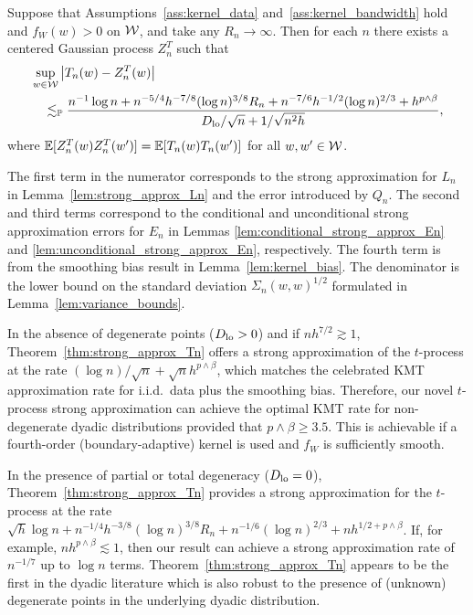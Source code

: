 \begin{theorem}
  \label{thm:strong_approx_Tn}

  Suppose that Assumptions~\ref{ass:kernel_data}
  and~\ref{ass:kernel_bandwidth} hold and
  $f_W(w) > 0$ on $\mathcal{W}$, and take any $R_n \to \infty$.
  Then for each $n$ there exists a
  centered Gaussian process $Z_n^{T}$ such that
  \begin{align*}
    &\sup_{w \in \mathcal{W}}
    \left|
    T_n(w)
    -
    Z_n^{T}(w)
    \right| \\
    &\quad\lesssim_{\mathbb{P}}
    \frac{
      n^{-1} \log n
      + n^{-5/4} h^{-7/8} (\log n)^{3/8} R_n
      + n^{-7/6} h^{-1/2} (\log n)^{2/3}
    + h^{p\wedge\beta}}
    {D_{\textup{lo}}/\sqrt{n} + 1/\sqrt{n^2h}},
  \end{align*}
  where $\mathbb{E}[Z_n^T(w)Z_n^T(w')] = \mathbb{E}[T_n(w)T_n(w')]$
  for all $w,w' \in \mathcal{W}$.
\end{theorem}

The first term in the numerator corresponds to
the strong approximation for $L_n$ in Lemma~\ref{lem:strong_approx_Ln}
and the error introduced by $Q_n$.
The second and third terms correspond to the conditional
and unconditional strong approximation errors for
$E_n$ in Lemmas \ref{lem:conditional_strong_approx_En}
and \ref{lem:unconditional_strong_approx_En}, respectively.
The fourth term is from the smoothing bias result
in Lemma~\ref{lem:kernel_bias}.
The denominator is the lower bound on the standard
deviation $\Sigma_n(w,w)^{1/2}$
formulated in Lemma~\ref{lem:variance_bounds}.

In the absence of degenerate points ($D_{\textup{lo}} > 0$) and if
$n h^{7/2}\gtrsim 1$, Theorem~\ref{thm:strong_approx_Tn}
offers a strong approximation of the $t$-process at the rate
$(\log n)/\sqrt{n}+\sqrt{n}h^{p\wedge\beta}$, which matches the celebrated KMT
approximation rate for i.i.d.\ data plus the
smoothing bias.
Therefore, our novel $t$-process strong
approximation can achieve the optimal KMT rate for
non-degenerate dyadic
distributions provided that $p\wedge\beta \geq 3.5$.
This is achievable
if a fourth-order (boundary-adaptive) kernel is used
and $f_W$ is sufficiently smooth.

In the presence of partial or total degeneracy ($D_{\textup{lo}} =0$),
Theorem~\ref{thm:strong_approx_Tn} provides a strong approximation for the
$t$-process at the rate
$\sqrt{h}\log n + n^{-1/4}h^{-3/8}(\log n)^{3/8} R_n +
n^{-1/6}(\log n)^{2/3} + n h^{1/2+p\wedge\beta}$.
If, for example, $n h^{p\wedge\beta}\lesssim 1$,
then our result can achieve a strong
approximation rate of $n^{-1/7}$
up to $\log n $ terms.
Theorem~\ref{thm:strong_approx_Tn}
appears to be the first in the dyadic literature
which is also robust to the presence of (unknown)
degenerate points in the underlying dyadic distribution.

